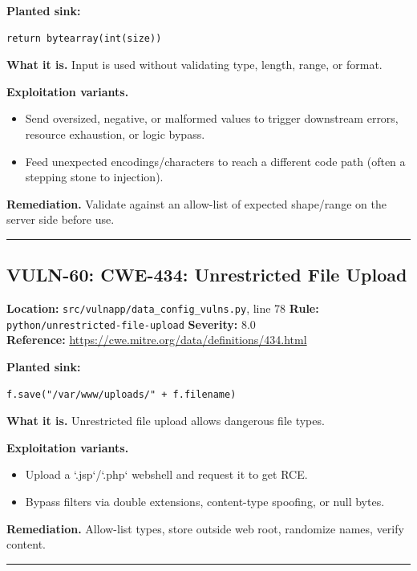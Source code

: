 \documentclass[11pt,a4paper]{article}
\begin{document}
\noindent\textbf{Planted sink:}
\begin{lstlisting}
return bytearray(int(size))
\end{lstlisting}
\noindent\textbf{What it is.} Input is used without validating type, length, range, or format.

\noindent\textbf{Exploitation variants.}
\begin{itemize}[leftmargin=1.4em,itemsep=1pt,topsep=2pt]
\item Send oversized, negative, or malformed values to trigger downstream errors, resource exhaustion, or logic bypass.
\item Feed unexpected encodings/characters to reach a different code path (often a stepping stone to injection).
\end{itemize}
\noindent\textbf{Remediation.} Validate against an allow-list of expected shape/range on the server side before use.

\vspace{4pt}\hrule\vspace{6pt}
\subsection{VULN-60: CWE-434: Unrestricted File Upload}
\noindent\textbf{Location:} \texttt{src/vulnapp/data\_config\_vulns.py}, line 78 \quad \textbf{Rule:} \texttt{python/unrestricted-file-upload} \quad \textbf{Severity:} 8.0
\\ \textbf{Reference:} \url{https://cwe.mitre.org/data/definitions/434.html}

\noindent\textbf{Planted sink:}
\begin{lstlisting}
f.save("/var/www/uploads/" + f.filename)
\end{lstlisting}
\noindent\textbf{What it is.} Unrestricted file upload allows dangerous file types.

\noindent\textbf{Exploitation variants.}
\begin{itemize}[leftmargin=1.4em,itemsep=1pt,topsep=2pt]
\item Upload a `.jsp`/`.php` webshell and request it to get RCE.
\item Bypass filters via double extensions, content-type spoofing, or null bytes.
\end{itemize}
\noindent\textbf{Remediation.} Allow-list types, store outside web root, randomize names, verify content.

\vspace{4pt}\hrule\vspace{6pt}
\end{document}
